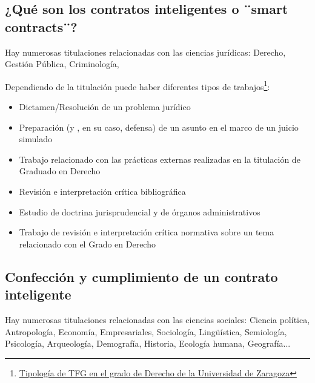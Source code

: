 \documentclass[12pt,spanish,chapterprefix, numbers=noenddot]{book}
\numberwithin{equation}{section}
\numberwithin{figure}{section}
\begin{document}
    \subsection{¿Qué son los contratos inteligentes o ¨smart contracts¨?}

    Hay numerosas titulaciones relacionadas con las ciencias jurídicas:
    Derecho, Gestión Pública, Criminología,

    Dependiendo de la titulación puede haber diferentes tipos de trabajos\footnote{\href{https://derecho.unizar.es/sites/derecho.unizar.es/files/archivos/documentos/tipologias_tfg_grado_en_derecho.pdf}{Tipología de TFG en el grado de Derecho de la Universidad de Zaragoza}}:
    \begin{itemize}
        \item Dictamen/Resolución de un problema jurídico
        \item Preparación (y , en su caso, defensa) de un asunto en el marco de
        un juicio simulado
        \item Trabajo relacionado con las prácticas externas realizadas en la titulación
        de Graduado en Derecho
        \item Revisión e interpretación crítica bibliográfica
        \item Estudio de doctrina jurisprudencial y de órganos administrativos
        \item Trabajo de revisión e interpretación crítica normativa sobre un tema
        relacionado con el Grado en Derecho
    \end{itemize}

    \subsection{Confección y cumplimiento de un contrato inteligente}

    Hay numerosas titulaciones relacionadas con las ciencias sociales:
    Ciencia política, Antropología, Economía, Empresariales, Sociología,
    Lingüística, Semiología, Psicología, Arqueología, Demografía, Historia,
    Ecología humana, Geografía...
\end{document}
